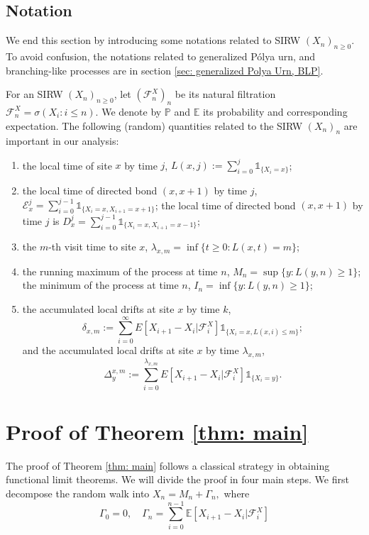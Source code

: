 \documentclass[twoside,12pt,a4paper]{article}
\numberwithin{equation}{section}
\begin{document}
	\subsection{Notation}
	We end this section by introducing some notations related to SIRW $(X_n)_{n\geq 0}$. To avoid confusion, the notations related to generalized P\'{o}lya urn, and branching-like processes are in section \ref{sec: generalized Polya Urn, BLP}.
	
	For an SIRW $(X_n)_{n\geq 0}$,  let $(\mathcal{F}^X_n)_n$ be its natural filtration $\mathcal{F}^X_n = \sigma\left(X_i: i\leq n \right).$ We denote by $\mathbb{P}$ and $\mathbb{E}$ its probability and corresponding expectation. The following (random) quantities related to the SIRW $(X_n)_n$ are important in our analysis:
	\begin{enumerate}
		\item the local time of site $x$ by time $j$, $L(x,j):= \sum_{i=0}^j \mathbb{1}_{\{X_i=x\} }$;
		
		\item the local time of directed bond $(x,x+1)$ by time $j$,
		$ \mathcal{E}^j_x = \sum_{i=0}^{j-1} \mathbb{1}_{\{X_i=x, X_{i+1} =x+1 \} } $; the local time of directed bond $(x,x+1)$ by time $j$ is $ D^j_x = \sum_{i=0}^{j-1} \mathbb{1}_{\{X_i=x, X_{i+1} =x-1 \} }; $
		
		
		\item the $m$-th visit time to site $x$, $\lambda_{x,m} = \inf\{t \geq 0: L(x,t) = m\}$;
		
		\item the running maximum of the process at time $n$, $M_n= \sup\{y: L(y,n)\geq 1 \} $; the minimum of the process at time $n$, $I_n= \inf\{y: L(y,n)\geq 1 \} $;
		
		\item the accumulated local drifts at site $x$ by time $k$, $$\delta_{x,m}:= \sum_{i=0}^\infty E[X_{i+1}-X_i\vert \mathcal{F}_{i}^X] \mathbb{1}_{\{X_i=x, L(x,i)\leq m\}};$$
		and the accumulated local drifts at site $x$ by time $\lambda_{x,m}$, 
		\begin{equation}\label{eq: accumulated local drift}
			\Delta_y^{x,m}:= \sum_{i=0}^{\lambda_{x,m}} E[X_{i+1}-X_i\vert \mathcal{F}_{i}^X] \mathbb{1}_{\{X_i=y\}}.
		\end{equation}
	\end{enumerate}
	
	\section{Proof of Theorem \ref{thm: main}}\label{sec: proof of main}
	The proof of Theorem \ref{thm: main} follows a classical strategy in obtaining functional limit theorems. We will divide the proof in four main steps. We first decompose the random walk into
	$X_n = M_n+ \Gamma_n, $ where
	$$ 
	\Gamma_0 = 0, \quad \Gamma_n = \sum_{i=0}^{n-1} \mathbb{E}\left[ X_{i+1}-X_i | \mathcal{F}_i^X \right]
	$$ 
	
\end{document}
